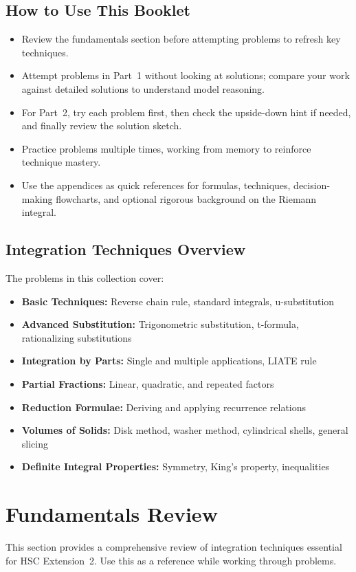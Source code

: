 \documentclass[12pt]{article}
\begin{document}
\subsection{How to Use This Booklet}
\begin{itemize}[leftmargin=*]
  \item Review the fundamentals section before attempting problems to refresh key techniques.
  \item Attempt problems in Part~1 without looking at solutions; compare your work against detailed solutions to understand model reasoning.
  \item For Part~2, try each problem first, then check the upside-down hint if needed, and finally review the solution sketch.
  \item Practice problems multiple times, working from memory to reinforce technique mastery.
  \item Use the appendices as quick references for formulas, techniques, decision-making flowcharts, and optional rigorous background on the Riemann integral.
\end{itemize}

\subsection{Integration Techniques Overview}
The problems in this collection cover:
\begin{itemize}[leftmargin=*]
  \item \textbf{Basic Techniques:} Reverse chain rule, standard integrals, u-substitution
  \item \textbf{Advanced Substitution:} Trigonometric substitution, t-formula, rationalizing substitutions
  \item \textbf{Integration by Parts:} Single and multiple applications, LIATE rule
  \item \textbf{Partial Fractions:} Linear, quadratic, and repeated factors
  \item \textbf{Reduction Formulae:} Deriving and applying recurrence relations
  \item \textbf{Volumes of Solids:} Disk method, washer method, cylindrical shells, general slicing
  \item \textbf{Definite Integral Properties:} Symmetry, King's property, inequalities
\end{itemize}

\newpage
\section{Fundamentals Review}
This section provides a comprehensive review of integration techniques essential for HSC Extension~2. Use this as a reference while working through problems.
\end{document}
